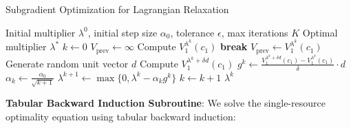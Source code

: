 \documentclass[11pt]{article}
\begin{document}
\begin{algorithm}[H]
\caption{Subgradient Optimization for Lagrangian Relaxation}
\begin{algorithmic}[1]
\Require Initial multiplier $\lambda^0$, initial step size $\alpha_0$, tolerance $\epsilon$, max iterations $K$
\Ensure Optimal multiplier $\lambda^*$
\State $k \gets 0$
\State $V_{\text{prev}} \gets \infty$
    \State Compute $V^{\lambda^k}_{1}(c_{1})$ 
        \State \textbf{break} 
    \EndIf
    \State $V_{\text{prev}} \gets V^{\lambda^k}_{1}(c_{1})$
    \State Generate random unit vector $d$
    \State Compute $V^{\lambda^k + \delta d}_{1}(c_{1})$ 
    \State $g^k \gets \frac{V^{\lambda^k + \delta d}_{1}(c_{1}) - V^{\lambda^k}_{1}(c_{1})}{\delta} \cdot d$ 
    \State $\alpha_k \gets \frac{\alpha_0}{\sqrt{k+1}}$ 
    \State $\lambda^{k+1} \gets \max\{0, \lambda^k - \alpha_k g^k\}$ 
    \State $k \gets k + 1$
\EndWhile
\State \Return $\lambda^k$
\end{algorithmic}
\end{algorithm}



\noindent
\textbf{Tabular Backward Induction Subroutine}:
We solve the single-resource optimality equation using tabular backward induction:
\end{document}
